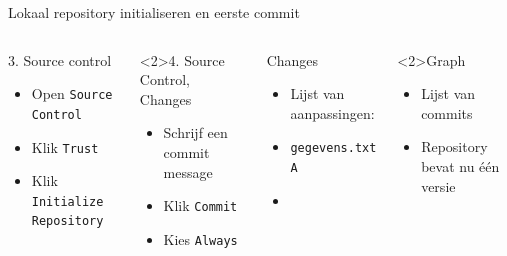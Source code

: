 \documentclass
[kulak] %
{kulakbeamer}
\begin{document}
	\begin{frame}{Lokaal repository initialiseren en eerste commit}
		\begin{columns}[T]
		
			\begin{block}{3. Source control}
				\begin{itemize}
					\item Open \texttt{Source Control}
					\item Klik \texttt{Trust}
					\item Klik \texttt{Initialize Repository}
				\end{itemize}
			\end{block}

			\begin{block}<2>{4. Source Control, Changes}
				\begin{itemize}
					\item Schrijf een commit message
					\item Klik \texttt{Commit}
					\item Kies \texttt{Always}
				\end{itemize}
			\end{block}
	
			\begin{exampleblock}{Changes}
				\begin{itemize}
					\item Lijst van aanpassingen:
					\item \texttt{gegevens.txt A}
					\item[]
				\end{itemize}
			\end{exampleblock}

			\begin{exampleblock}<2>{Graph}
			\begin{itemize}
				\item Lijst van commits
				\item Repository bevat nu één versie
			\end{itemize}
		\end{exampleblock}
		\end{columns}
	\end{frame}
	
\end{document}
